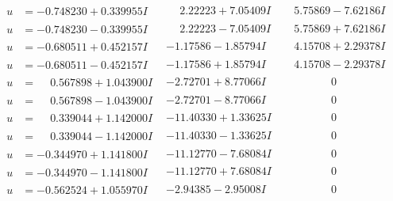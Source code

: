 \documentclass[1p]{elsarticle_modified}
\theoremstyle{definition}
\begin{document}
$$\begin{array}{c|c|c}
\begin{aligned}
u &= -0.748230 + 0.339955 I\end{aligned}
 & \phantom{-}2.22223 + 7.05409 I & \phantom{-}5.75869 - 7.62186 I \\ \hline\begin{aligned}
u &= -0.748230 - 0.339955 I\end{aligned}
 & \phantom{-}2.22223 - 7.05409 I & \phantom{-}5.75869 + 7.62186 I \\ \hline\begin{aligned}
u &= -0.680511 + 0.452157 I\end{aligned}
 & -1.17586 - 1.85794 I & \phantom{-}4.15708 + 2.29378 I \\ \hline\begin{aligned}
u &= -0.680511 - 0.452157 I\end{aligned}
 & -1.17586 + 1.85794 I & \phantom{-}4.15708 - 2.29378 I \\ \hline\begin{aligned}
u &= \phantom{-}0.567898 + 1.043900 I\end{aligned}
 & -2.72701 + 8.77066 I & \phantom{-0.000000 } 0 \\ \hline\begin{aligned}
u &= \phantom{-}0.567898 - 1.043900 I\end{aligned}
 & -2.72701 - 8.77066 I & \phantom{-0.000000 } 0 \\ \hline\begin{aligned}
u &= \phantom{-}0.339044 + 1.142000 I\end{aligned}
 & -11.40330 + 1.33625 I & \phantom{-0.000000 } 0 \\ \hline\begin{aligned}
u &= \phantom{-}0.339044 - 1.142000 I\end{aligned}
 & -11.40330 - 1.33625 I & \phantom{-0.000000 } 0 \\ \hline\begin{aligned}
u &= -0.344970 + 1.141800 I\end{aligned}
 & -11.12770 - 7.68084 I & \phantom{-0.000000 } 0 \\ \hline\begin{aligned}
u &= -0.344970 - 1.141800 I\end{aligned}
 & -11.12770 + 7.68084 I & \phantom{-0.000000 } 0 \\ \hline\begin{aligned}
u &= -0.562524 + 1.055970 I\end{aligned}
 & -2.94385 - 2.95008 I & \phantom{-0.000000 } 0 \\ \hline\begin{aligned}

\end{aligned}
\end{array}$$
\end{document}
